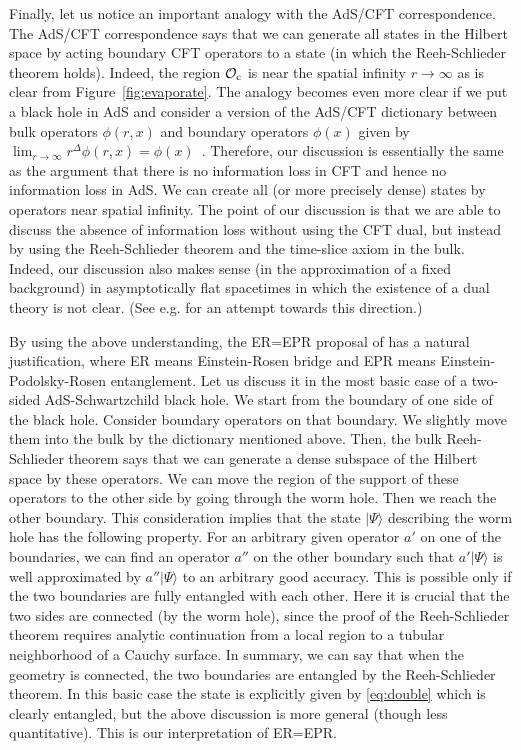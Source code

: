 \documentclass[a4paper,11pt]{article}
\theoremstyle{plain}
\theoremstyle{definition}
\numberwithin{thm}{section}
\newcommand{\ket}[1]{ | {#1} \rangle }
\def\CO{{\cal O}}
\begin{document}
Finally, let us notice an important analogy with the AdS/CFT correspondence.
The AdS/CFT correspondence says that we can generate all states in the Hilbert space by acting boundary CFT operators to a state (in which the Reeh-Schlieder theorem holds).
Indeed, the region $\CO_{\rm c}$ is near the spatial infinity $r \to \infty$ as is clear from Figure~\ref{fig:evaporate}.
The analogy becomes even more clear if we put a black hole in AdS and consider a version of the AdS/CFT dictionary between bulk operators $\phi(r,x)$ and boundary operators $\phi(x)$
given by $\lim_{r \to \infty} r^\Delta \phi(r,x) = \phi(x)$~\cite{Banks:1998dd,Harlow:2011ke}.
Therefore, our discussion is essentially the same as the argument that there is no information loss in CFT and hence no information loss in AdS.
We can create all (or more precisely dense) states by operators near spatial infinity. 
The point of our discussion is that we are able to discuss the absence of information loss without using the CFT dual,
but instead by using the Reeh-Schlieder theorem and the time-slice axiom in the bulk. Indeed, our discussion also makes sense (in the approximation of a fixed background) in asymptotically flat spacetimes in which
the existence of a dual theory is not clear. (See e.g. \cite{Nomura:2016ikr} for an attempt towards this direction.)

By using the above understanding, the ER=EPR proposal of \cite{Maldacena:2013xja} has a natural justification,
where ER means Einstein-Rosen bridge and EPR means Einstein-Podolsky-Rosen entanglement. 
Let us discuss it in the most basic case of a two-sided AdS-Schwartzchild black hole.
We start from the boundary of one side of the black hole. Consider boundary operators on that boundary. We slightly move them into the bulk by the dictionary mentioned above.
Then, the bulk Reeh-Schlieder theorem says that we can generate a dense subspace of the Hilbert space by these operators. We can move the region of the support of these operators
to the other side by going through the worm hole. Then we reach the other boundary. This consideration implies that the state $\ket{\Psi}$ describing the worm hole
has the following property. For an arbitrary given operator $a'$ on one of the boundaries, we can find an operator $a''$ on the other boundary
such that $a'\ket{\Psi}$ is well approximated by $a''\ket{\Psi}$ to an arbitrary good accuracy. This is possible only if the two boundaries are fully entangled with each other.
Here it is crucial that the two sides are connected (by the worm hole), since the proof of the Reeh-Schlieder theorem requires analytic continuation from a local region to a tubular neighborhood of a Cauchy surface.
In summary, we can say that when the geometry is connected, the two boundaries are entangled by the Reeh-Schlieder theorem. In this basic case
the state is explicitly given by \eqref{eq:double} which is clearly entangled, but the above discussion is more general (though less quantitative).
This is our interpretation of ER=EPR. 
\end{document}
